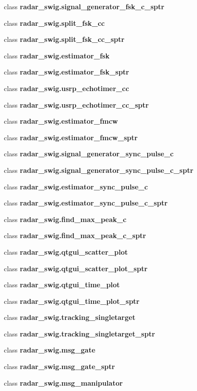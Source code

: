 \begin{DoxyCompactItemize}
\item 
class {\bf radar\+\_\+swig.\+signal\+\_\+generator\+\_\+fsk\+\_\+c\+\_\+sptr}
\item 
class {\bf radar\+\_\+swig.\+split\+\_\+fsk\+\_\+cc}
\item 
class {\bf radar\+\_\+swig.\+split\+\_\+fsk\+\_\+cc\+\_\+sptr}
\item 
class {\bf radar\+\_\+swig.\+estimator\+\_\+fsk}
\item 
class {\bf radar\+\_\+swig.\+estimator\+\_\+fsk\+\_\+sptr}
\item 
class {\bf radar\+\_\+swig.\+usrp\+\_\+echotimer\+\_\+cc}
\item 
class {\bf radar\+\_\+swig.\+usrp\+\_\+echotimer\+\_\+cc\+\_\+sptr}
\item 
class {\bf radar\+\_\+swig.\+estimator\+\_\+fmcw}
\item 
class {\bf radar\+\_\+swig.\+estimator\+\_\+fmcw\+\_\+sptr}
\item 
class {\bf radar\+\_\+swig.\+signal\+\_\+generator\+\_\+sync\+\_\+pulse\+\_\+c}
\item 
class {\bf radar\+\_\+swig.\+signal\+\_\+generator\+\_\+sync\+\_\+pulse\+\_\+c\+\_\+sptr}
\item 
class {\bf radar\+\_\+swig.\+estimator\+\_\+sync\+\_\+pulse\+\_\+c}
\item 
class {\bf radar\+\_\+swig.\+estimator\+\_\+sync\+\_\+pulse\+\_\+c\+\_\+sptr}
\item 
class {\bf radar\+\_\+swig.\+find\+\_\+max\+\_\+peak\+\_\+c}
\item 
class {\bf radar\+\_\+swig.\+find\+\_\+max\+\_\+peak\+\_\+c\+\_\+sptr}
\item 
class {\bf radar\+\_\+swig.\+qtgui\+\_\+scatter\+\_\+plot}
\item 
class {\bf radar\+\_\+swig.\+qtgui\+\_\+scatter\+\_\+plot\+\_\+sptr}
\item 
class {\bf radar\+\_\+swig.\+qtgui\+\_\+time\+\_\+plot}
\item 
class {\bf radar\+\_\+swig.\+qtgui\+\_\+time\+\_\+plot\+\_\+sptr}
\item 
class {\bf radar\+\_\+swig.\+tracking\+\_\+singletarget}
\item 
class {\bf radar\+\_\+swig.\+tracking\+\_\+singletarget\+\_\+sptr}
\item 
class {\bf radar\+\_\+swig.\+msg\+\_\+gate}
\item 
class {\bf radar\+\_\+swig.\+msg\+\_\+gate\+\_\+sptr}
\item 
class {\bf radar\+\_\+swig.\+msg\+\_\+manipulator}

\end{DoxyCompactItemize}
